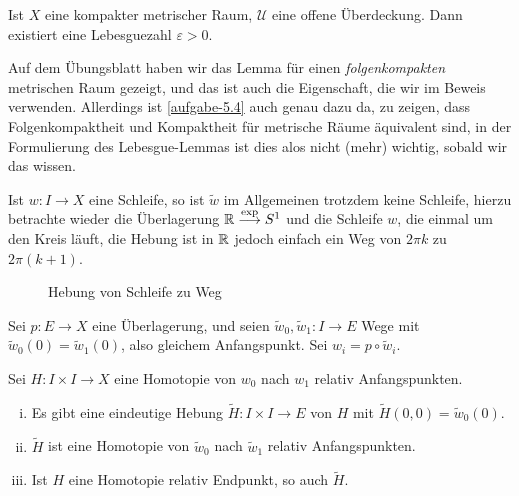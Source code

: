 \begin{lemma*}\label{lm:lebesgue}
    Ist $X$ eine kompakter metrischer Raum,  $\mathcal{U}$ eine offene Überdeckung. Dann existiert eine Lebesguezahl $ε>0$.
\end{lemma*}

\begin{remark*}
    Auf dem Übungsblatt haben wir das Lemma für einen \textit{folgenkompakten} metrischen Raum gezeigt, und das ist auch die Eigenschaft, die wir im Beweis verwenden. Allerdings ist \autoref{aufgabe-5.4} auch genau dazu da, zu zeigen, dass Folgenkompaktheit und Kompaktheit für metrische Räume äquivalent sind, in der Formulierung des Lebesgue-Lemmas ist dies alos nicht (mehr) wichtig, sobald wir das wissen.
\end{remark*}

\begin{remark}
    Ist $w\colon  I \to  X$ eine Schleife, so ist $\tilde{w}$ im Allgemeinen trotzdem keine Schleife, hierzu betrachte wieder die Überlagerung $\mathbb{R} \stackrel{\exp }{\longrightarrow} S^1$ und die Schleife $w$, die einmal um den Kreis läuft, die Hebung ist in $\mathbb{R}$ jedoch einfach ein Weg von $2\pi k$ zu $2\pi(k+1)$.
\end{remark}

\begin{figure}[ht]
    \centering
    \caption{Hebung von Schleife zu Weg}
    \label{fig:hebung-von-schleife-zu-weg}
\end{figure}

\begin{theorem}[Homotopieliftungssatz]\label{thm:homotopieliftungssatz}
    Sei $p\colon  E \to  X$ eine Überlagerung, und seien $\tilde{w}_0, \tilde{w}_1\colon  I \to  E$ Wege mit $\tilde{w}_0(0) = \tilde{w}_1(0)$, also gleichem Anfangspunkt. Sei $w_i = p \circ  \tilde{w}_i$.

    Sei $H\colon  I \times I \to  X$ eine Homotopie von $w_0$ nach $w_1$ relativ Anfangspunkten.

    \begin{enumerate}[i)]
        \item Es gibt eine eindeutige Hebung $\tilde{H}\colon  I \times I \to  E$ von $H$ mit  $\tilde{H}(0,0) = \tilde{w}_0(0)$.
        \item $\tilde{H}$ ist eine Homotopie von $\tilde{w}_0$ nach $\tilde{w}_1$ relativ Anfangspunkten.
        \item Ist $H$ eine Homotopie relativ Endpunkt, so auch  $\tilde{H}$.
    \end{enumerate}
\end{theorem}


